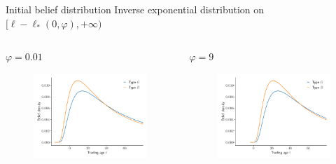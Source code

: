 \documentclass{beamer}
\begin{document}
\begin{frame}{Initial belief distribution}
	Inverse exponential distribution on 
	$[\ell - \ell_*(0, \varphi), +\infty)$
	
	\begin{columns}[t]
	\begin{column}{0.49\textwidth}
		\begin{block}{$\varphi = 0.01$}
			\begin{figure}
				\includegraphics[width=\linewidth]{figures/ldist1}
			\end{figure}
		\end{block}  
	\end{column}
	
	\begin{column}{0.49\textwidth}
		\begin{block}{$\varphi = 9$}
			\begin{figure}
				\includegraphics[width=\linewidth]{figures/ldist2}
			\end{figure}
		\end{block}  
	\end{column}
\end{columns}
\end{frame}
\end{document}
